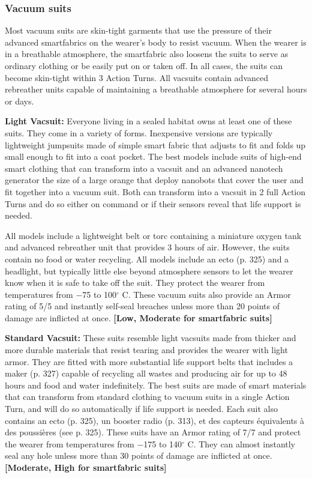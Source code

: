 {{\subsubsection{Vacuum suits} 

Most vacuum suits are skin-tight garments that use the pressure of their advanced smartfabrics on the wearer’s body to resist vacuum. When the wearer is in a breathable atmosphere, the smartfabric also loosens the suits to serve as ordinary clothing or be easily put on or taken off. In all cases, the suits can become skin-tight within 3 Action Turns. All vacsuits contain advanced rebreather units capable of maintaining a breathable atmosphere for several hours or days. 

\textbf{Light Vacsuit:} Everyone living in a sealed habitat owns at least one of these suits. They come in a variety of forms. Inexpensive versions are typically lightweight jumpsuits made of simple smart fabric that adjusts to fit and folds up small enough to fit into a coat pocket. The best models include suits of high-end smart clothing that can transform into a vacsuit and an advanced nanotech generator the size of a large orange that deploy nanobots that cover the user and fit together into a vacuum suit. Both can transform into a vacsuit in 2 full Action Turns and do so either on command or if their sensors reveal that life support is needed. 

All models include a lightweight belt or torc containing a miniature oxygen tank and advanced rebreather unit that provides 3 hours of air. However, the suits contain no food or water recycling. All models include an ecto (p. 325) and a headlight, but typically little else beyond atmosphere sensors to let the wearer know when it is safe to take off the suit. They protect the wearer from temperatures from $-$75 to 100$^{\circ}$ C. These vacuum suits also provide an Armor rating of 5/5 and instantly self-seal breaches unless more than 20 points of damage are inflicted at once. \textbf{[Low, Moderate for smartfabric suits]} 

\textbf{Standard Vacsuit:} These suits resemble light vacsuits made from thicker and more durable materials that resist tearing and provides the wearer with light armor. They are fitted with more substantial life support belts that includes a maker (p. 327) capable of recycling all wastes and producing air for up to 48 hours and food and water indefinitely. The best suits are made of smart materials that can transform from standard clothing to vacuum suits in a single Action Turn, and will do so automatically if life support is needed. Each suit also contains an ecto (p. 325), un booster  radio (p. 313), et des capteurs équivalents à des poussières (see p. 325). These suits have an Armor rating of 7/7 and protect the wearer from temperatures from $-$175 to 140$^{\circ}$ C. They can almost instantly seal any hole unless more than 30 points of damage are inflicted at once. \textbf{[Moderate, High for smartfabric suits]} 

}}
